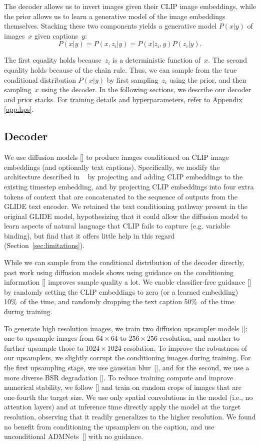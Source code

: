 \documentclass{article}
\newcommand{\shortcite}[1]{[\citenum{#1}]}
\newcommand{\namecite}[1]{\citeauthor{#1} [\citenum{#1}]}
\begin{document}
The decoder allows us to invert images given their CLIP image embeddings, while the prior allows us to learn a generative model of the image embeddings themselves. Stacking these two components yields a generative model $P(x|y)$ of images~$x$ given captions~$y$:
$$P(x|y) = P(x,z_i|y) = P(x|z_i,y) P(z_i|y).$$

The first equality holds because~$z_i$ is a deterministic function of~$x$. The second equality holds because of the chain rule. Thus, we can sample from the true conditional distribution $P(x|y)$ by first sampling~$z_i$ using the prior, and then sampling~$x$ using the decoder. In the following sections, we describe our decoder and prior stacks. For training details and hyperparameters, refer to Appendix \ref{app:hps}.

\subsection{Decoder}
We use diffusion models \shortcite{ddpm,improvedscore} to produce images conditioned on CLIP image embeddings (and optionally text captions). Specifically, we modify the architecture described in ~\cite{glide} by projecting and adding CLIP embeddings to the existing timestep embedding, and by projecting CLIP embeddings into four extra tokens of context that are concatenated to the sequence of outputs from the GLIDE text encoder. We retained the text conditioning pathway present in the original GLIDE model, hypothesizing that it could allow the diffusion model to learn aspects of natural language that CLIP fails to capture (e.g. variable binding), but find that it offers little help in this regard (Section~\ref{sec:limitations}). 

While we can sample from the conditional distribution of the decoder directly, past work using diffusion models shows using guidance on the conditioning information \shortcite{sotapaper,uncond,glide} improves sample quality a lot. We enable classifier-free guidance \shortcite{uncond} by randomly setting the CLIP embeddings to zero (or a learned embedding) 10\%~of the time, and randomly dropping the text caption 50\%~of the time during training. 

To generate high resolution images, we train two diffusion upsampler models \shortcite{improved,sr3}: one to upsample images from $64 \times 64$ to $256 \times 256$ resolution, and another to further upsample those to $1024 \times 1024$ resolution. To improve the robustness of our upsamplers, we slightly corrupt the conditioning images during training. For the first upsampling stage, we use gaussian blur~\shortcite{sr3}, and for the second, we use a more diverse BSR degradation \shortcite{latentdiffusion,bsr}. To reduce training compute and improve numerical stability, we follow \namecite{latentdiffusion} and train on random crops of images that are one-fourth the target size. We use only spatial convolutions in the model (i.e., no attention layers) and at inference time directly apply the model at the target resolution, observing that it readily generalizes to the higher resolution. We found no benefit from conditioning the upsamplers on the caption, and use unconditional ADMNets~\shortcite{sotapaper} with no guidance. 
\end{document}
